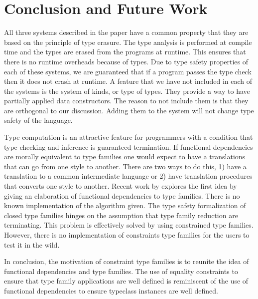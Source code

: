 \documentclass[format=acmsmall,manuscript,review,screen,nonacm,margin=1in,11pt]{acmart}
\begin{document}
\section{Conclusion and Future Work}\label{sec:conclusion}
All three systems described in the paper have a common property that they are based on
the principle of type erasure. The type analysis is performed at compile time and
the types are erased from the programs at runtime.
This ensures that there is no runtime overheads because of types.
Due to type safety properties of each of these systems, we are guaranteed
that if a program passes the type check then it does not crash at runtime.
A feature that we have not included in each of the systems is the system of kinds, or type of types.
They provide a way to have partially applied data constructors. The reason to not include them is that
they are orthogonal to our discussion. Adding them to the system will not change type safety of the language.


Type computation is an attractive feature for programmers with a condition that type checking and inference
is guaranteed termination. If functional dependencies are morally equivalent to type families
one would expect to have a translations that can go from one style to another.
There are two ways to do this, 1) have a translation to a common
intermediate language or 2) have translation procedures that converts one style to another. Recent work by
\citep{karachalias_elaboration_2017} explores the first idea by giving an elaboration of functional dependencies
to type families. There is no known implementation of the algorithm given.
The type safety formalization of closed type families hinges on the assumption that
type family reduction are terminating. This problem is effectively solved by using constrained type families.
However, there is no implementation of constraints type families for the users to test it in the wild.

In conclusion, the motivation of constraint type families is to reunite
the idea of functional dependencies and type families.
The use of equality constraints to ensure that type family applications are well defined
is reminiscent of the use of functional dependencies to ensure typeclass instances are well defined.
\newpage


\end{document}
